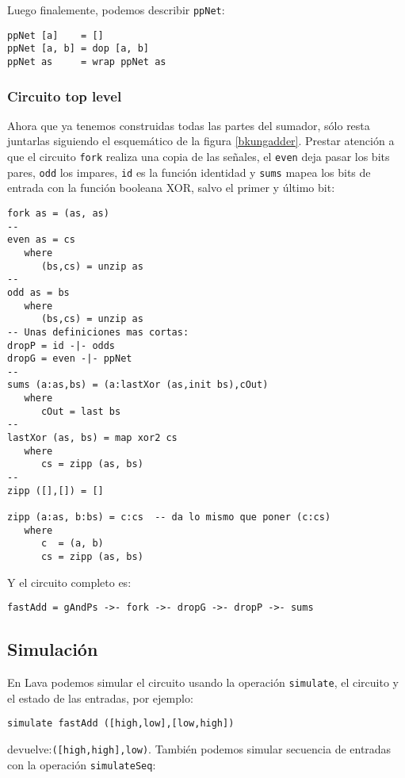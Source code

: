 \noindent Luego finalemente, podemos describir {\verb|ppNet|}:

\begin{lstlisting}
ppNet [a]    = []
ppNet [a, b] = dop [a, b]
ppNet as     = wrap ppNet as
\end{lstlisting}


\subsubsection{Circuito top level}
Ahora que ya tenemos construidas todas las partes del sumador, sólo resta juntarlas siguiendo el esquemático de la figura \ref{bkungadder}. Prestar atención a que el circuito \verb|fork| realiza una copia de las señales, el \verb|even| deja pasar los bits pares, \verb|odd| los impares, \verb|id| es la función identidad y \verb|sums| mapea los bits de entrada con la función booleana XOR, salvo el primer y último bit:

\begin{lstlisting}
fork as = (as, as)
--
even as = cs
   where
      (bs,cs) = unzip as
--
odd as = bs
   where
      (bs,cs) = unzip as
-- Unas definiciones mas cortas:
dropP = id -|- odds
dropG = even -|- ppNet
--
sums (a:as,bs) = (a:lastXor (as,init bs),cOut)
   where
      cOut = last bs
--
lastXor (as, bs) = map xor2 cs
   where
      cs = zipp (as, bs)
--
zipp ([],[]) = []

zipp (a:as, b:bs) = c:cs  -- da lo mismo que poner (c:cs)
   where
      c  = (a, b)
      cs = zipp (as, bs)
\end{lstlisting}

\noindent Y el circuito completo es:
\begin{lstlisting}
fastAdd = gAndPs ->- fork ->- dropG ->- dropP ->- sums
\end{lstlisting}

\subsection{Simulación}
En Lava podemos simular el circuito usando la operación {\footnotesize\verb.simulate.}, el circuito y el estado de las entradas, por ejemplo:

{\footnotesize
\begin{verbatim}
simulate fastAdd ([high,low],[low,high])
\end{verbatim}
}

\noindent devuelve:{\footnotesize \verb|([high,high],low)|}. También podemos simular secuencia de entradas con la operación {\footnotesize\verb|simulateSeq|}:

